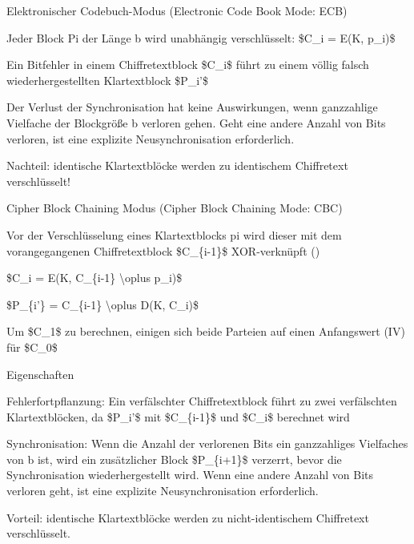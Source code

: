 \documentclass[a4paper]{article}
\begin{document}
\begin{multicols}{3}
      Elektronischer Codebuch-Modus (Electronic Code Book Mode: ECB)

      \begin{itemize*}
            \item Jeder Block Pi der Länge b wird unabhängig verschlüsselt: \$C\_i =
            E(K, p\_i)\$
            \item Ein Bitfehler in einem Chiffretextblock \$C\_i\$ führt zu einem völlig
            falsch wiederhergestellten Klartextblock \$P\_i'\$
            \item Der Verlust der Synchronisation hat keine Auswirkungen, wenn
            ganzzahlige Vielfache der Blockgröße b verloren gehen. Geht eine
            andere Anzahl von Bits verloren, ist eine explizite Neusynchronisation
            erforderlich.
            \item Nachteil: identische Klartextblöcke werden zu identischem Chiffretext
            verschlüsselt!
      \end{itemize*}

      Cipher Block Chaining Modus (Cipher Block Chaining Mode: CBC)

      \begin{itemize*}
            \item Vor der Verschlüsselung eines Klartextblocks pi wird dieser mit dem
            vorangegangenen Chiffretextblock \$C\_\{i-1\}\$ XOR-verknüpft ()
            \begin{itemize*}
                  \item \$C\_i = E(K, C\_\{i-1\} \textbackslash oplus p\_i)\$
                  \item \$P\_\{i'\} = C\_\{i-1\} \textbackslash oplus D(K, C\_i)\$
                  \item Um \$C\_1\$ zu berechnen, einigen sich beide Parteien auf einen Anfangswert (IV) für \$C\_0\$
            \end{itemize*}
            \item Eigenschaften
            \begin{itemize*}
                  \item Fehlerfortpflanzung: Ein verfälschter Chiffretextblock führt zu zwei verfälschten Klartextblöcken, da \$P\_i'\$ mit \$C\_\{i-1\}\$ und \$C\_i\$ berechnet wird
                  \item Synchronisation: Wenn die Anzahl der verlorenen Bits ein ganzzahliges Vielfaches von b ist, wird ein zusätzlicher Block \$P\_\{i+1\}\$ verzerrt, bevor die Synchronisation wiederhergestellt wird. Wenn eine andere Anzahl von Bits verloren geht, ist eine explizite Neusynchronisation erforderlich.
                  \item Vorteil: identische Klartextblöcke werden zu nicht-identischem Chiffretext verschlüsselt.
            \end{itemize*}
      \end{itemize*}


\end{multicols}
\end{document}
